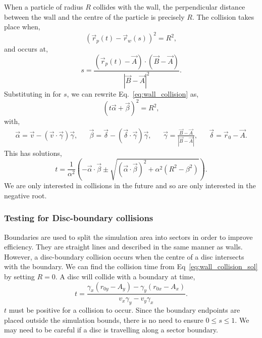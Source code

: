 \documentclass{article}
\begin{document}
When a particle of radius $R$ collides with the wall, the perpendicular distance between the wall and the centre of the particle is precisely $R$. The collision takes place when,
\begin{equation}
\label{eq:wall_collision}
    (\vec{r}_p(t) - \vec{r}_w(s))^2 = R^2,
\end{equation}
and occurs at,
\begin{equation}
    s
    =
    \frac{(\vec{r}_p(t) - \vec{A}) \cdot (\vec{B} - \vec{A})}{|\vec{B} - \vec{A}|^2}.
\end{equation}
Substituting in for $s$, we can rewrite Eq.~\ref{eq:wall_collision} as,
\begin{equation}
    (t\vec{\alpha} + \vec{\beta})^2 = R^2,
\end{equation}
with,
\begin{align}
    \vec{\alpha}
    =
    \vec{v} - (\vec{v} \cdot \vec{\gamma}) \vec{\gamma},
    &&
    \vec{\beta}
    =
    \vec{\delta} - (\vec{\delta} \cdot \vec{\gamma}) \vec{\gamma},
    &&
    \vec{\gamma} = \frac{\vec{B} - \vec{A}}{|\vec{B}-\vec{A}|},
    &&
    \vec{\delta} = \vec{r}_0 - \vec{A}.
\end{align}
This has solutions,
\begin{equation}
\label{eq:wall_collision_sol}
    t
    =
    \frac{1}{\alpha^2}
    \left(
        -\vec{\alpha} \cdot \vec{\beta}
        \pm
        \sqrt{(\vec{\alpha} \cdot \vec{\beta})^2 + \alpha^2(R^2 - \beta^2)}
    \right).
\end{equation}
We are only interested in collisions in the future and so are only interested in the negative root.

\subsubsection{Testing for Disc-boundary collisions}
Boundaries are used to split the simulation area into sectors in order to improve efficiency. They are straight lines and described in the same manner as walls. However, a disc-boundary collision occurs when the centre of a disc intersects with the boundary. We can find the collision time from Eq~\ref{eq:wall_collision_sol} by setting $R = 0$. A disc will collide with a boundary at time,
\begin{equation}
    t
    =
    \frac{\gamma_x (r_{0y} - A_y) - \gamma_y (r_{0x} - A_x)}{v_x \gamma_y - v_y \gamma_x}.
\end{equation}
$t$ must be positive for a collision to occur. Since the boundary endpoints are placed outside the simulation bounds, there is no need to ensure $0 \leq s \leq 1$. We may need to be careful if a disc is travelling along a sector boundary.
\end{document}
